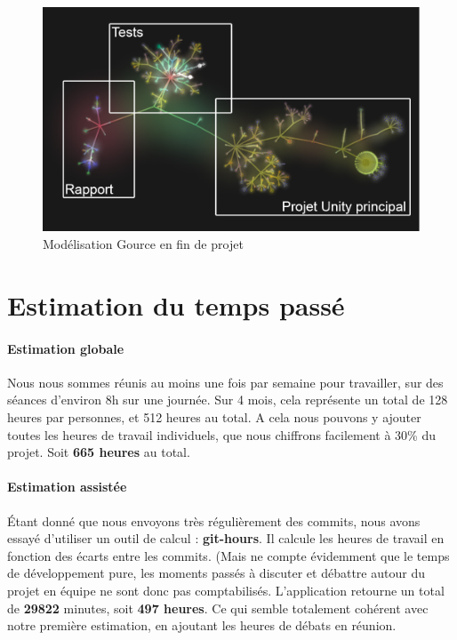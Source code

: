 \begin{figure}[H]\centering
  \includegraphics[scale=.3]{./img/gource_over.png}
  \caption{Modélisation Gource en fin de projet}
  \label{gource_over}
\end{figure}
 
\section{Estimation du temps passé}
 
\paragraph{Estimation globale}
Nous nous sommes réunis au moins une fois par semaine pour travailler, sur des séances d'environ 8h sur une journée. Sur 4 mois, cela représente un total de 128 heures par personnes, et 512 heures au total. A cela nous pouvons y ajouter toutes les heures de travail individuels, que nous chiffrons facilement à 30\% du projet. Soit \textbf{665 heures} au total.
 
\paragraph{Estimation assistée}
Étant donné que nous envoyons très régulièrement des commits, nous avons essayé d'utiliser un outil de calcul :  \textbf{git-hours}. Il calcule les heures de travail en fonction des écarts entre les commits. (Mais ne compte évidemment que le temps de développement pure, les moments passés à discuter et débattre autour du projet en équipe ne sont donc pas comptabilisés. L'application retourne un total de \textbf{29822} minutes, soit \textbf{497 heures}. Ce qui semble totalement cohérent avec notre première estimation, en ajoutant les heures de débats en réunion.
 

